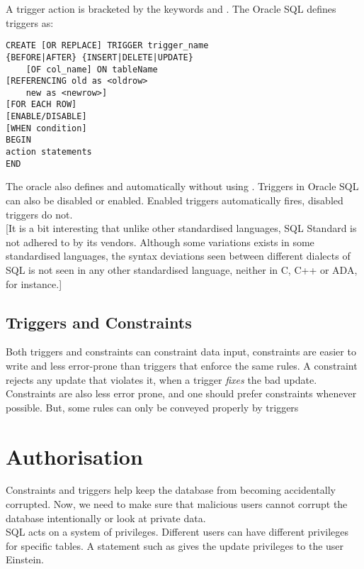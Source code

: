 \documentclass[11pt,a4paper,twocolumn]{book}
\begin{document}
A trigger action is bracketed by the keywords  and . The Oracle SQL defines triggers as:

\begin{lstlisting}
CREATE [OR REPLACE] TRIGGER trigger_name
{BEFORE|AFTER} {INSERT|DELETE|UPDATE}
	[OF col_name] ON tableName
[REFERENCING old as <oldrow>
	new as <newrow>]
[FOR EACH ROW]
[ENABLE/DISABLE]
[WHEN condition]
BEGIN
action statements
END
\end{lstlisting}

The oracle also defines  and  automatically without using . Triggers in Oracle SQL can also be disabled or enabled. Enabled triggers automatically fires, disabled triggers do not.\\

[It is a bit interesting that unlike other standardised languages, SQL Standard is not adhered to by its vendors. Although some variations exists in some standardised languages, the syntax deviations seen between different dialects of SQL is not seen in any other standardised language, neither in C, C++ or ADA, for instance.]

\subsection{Triggers and Constraints}

Both triggers and constraints can constraint data input, constraints are easier to write and less error-prone than triggers that enforce the same rules. A constraint rejects any update that violates it, when a trigger \textit{fixes} the bad update. Constraints are also less error prone, and one should prefer constraints whenever possible. But, some rules can only be conveyed properly by triggers

\section{Authorisation}

Constraints and triggers help keep the database from becoming accidentally corrupted. Now, we need to make sure that malicious users cannot corrupt the database intentionally or look at private data.\\

SQL acts on a system of privileges. Different users can have different privileges for specific tables. A statement such as  gives the update privileges to the user Einstein.\\
\end{document}
